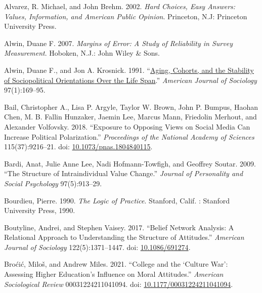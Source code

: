 \documentclass[
  12pt,
]{article}
\newlength{\cslhangindent}
\newlength{\cslentryspacingunit} %
\newenvironment{CSLReferences}[2] %
 {%
  \setlength{\parindent}{0pt}
  \ifodd #1
  \let\oldpar\par
  \def\par{\hangindent=\cslhangindent\oldpar}
  \fi
  \setlength{\parskip}{#2\cslentryspacingunit}
 }%
 {}
\begin{document}
\hypertarget{refs}{}
\begin{CSLReferences}{1}{0}
\leavevmode{}%
Alvarez, R. Michael, and John Brehm. 2002. \emph{Hard Choices, Easy
Answers: Values, Information, and {American} Public Opinion}. Princeton,
N.J: Princeton University Press.

\leavevmode{}%
Alwin, Duane F. 2007. \emph{Margins of {Error}: {A} {Study} of
{Reliability} in {Survey} {Measurement}}. Hoboken, N.J.: John Wiley \&
Sons.

\leavevmode{}%
Alwin, Duane F., and Jon A. Krosnick. 1991.
{``\href{https://www.jstor.org/stable/2781642}{Aging, {Cohorts}, and the
{Stability} of {Sociopolitical} {Orientations} {Over} the {Life}
{Span}}.''} \emph{American Journal of Sociology} 97(1):169--95.

\leavevmode{}%
Bail, Christopher A., Lisa P. Argyle, Taylor W. Brown, John P. Bumpus,
Haohan Chen, M. B. Fallin Hunzaker, Jaemin Lee, Marcus Mann, Friedolin
Merhout, and Alexander Volfovsky. 2018. {``Exposure to Opposing Views on
Social Media Can Increase Political Polarization.''} \emph{Proceedings
of the National Academy of Sciences} 115(37):9216--21. doi:
\href{https://doi.org/10.1073/pnas.1804840115}{10.1073/pnas.1804840115}.

\leavevmode{}%
Bardi, Anat, Julie Anne Lee, Nadi Hofmann-Towfigh, and Geoffrey Soutar.
2009. {``The Structure of Intraindividual Value Change.''} \emph{Journal
of Personality and Social Psychology} 97(5):913--29.

\leavevmode{}%
Bourdieu, Pierre. 1990. \emph{The Logic of Practice}. Stanford, Calif. :
Stanford University Press, 1990.

\leavevmode{}%
Boutyline, Andrei, and Stephen Vaisey. 2017. {``Belief {Network}
{Analysis}: {A} {Relational} {Approach} to {Understanding} the
{Structure} of {Attitudes}.''} \emph{American Journal of Sociology}
122(5):1371--1447. doi:
\href{https://doi.org/10.1086/691274}{10.1086/691274}.

\leavevmode{}%
Broćić, Miloš, and Andrew Miles. 2021. {``College and the {`{Culture}
{War}'}: {Assessing} {Higher} {Education}'s {Influence} on {Moral}
{Attitudes}.''} \emph{American Sociological Review} 00031224211041094.
doi:
\href{https://doi.org/10.1177/00031224211041094}{10.1177/00031224211041094}.


\end{CSLReferences}
\end{document}

